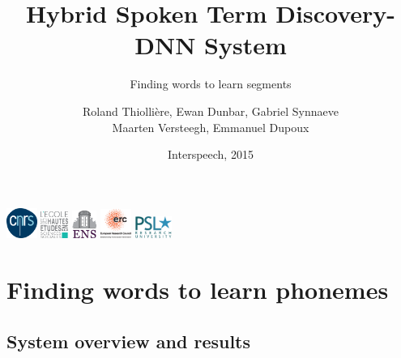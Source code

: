 \documentclass{beamer}
\title[Hybrid STD-DNN system]{
Hybrid Spoken Term Discovery-DNN System
}
\subtitle{Finding words to learn segments}
\author[Roland Thiolliere]{
Roland Thiolli\`ere\inst{*}, Ewan Dunbar\inst{*}, Gabriel Synnaeve\inst{*\dagger}\\Maarten Versteegh\inst{*}, Emmanuel Dupoux\inst{*}
}
\institute[ENS] %
{
\inst{*} LSCP, \'{E}cole Normale Sup\'{e}rieure / EHESS / CNRS, Paris, France\\%
\inst{\dagger} now at Facebook AI Research\\[0.5ex]
\inst{} \begin{small}\texttt{rolthiolliere@gmail.com, emd@umd.edu, gabrielsynnaeve@gmail.com, maartenversteegh@gmail.com, emmanuel.dupoux@gmail.com}\end{small}
}
\date{Interspeech, 2015}
\begin{document}
\begin{frame}
  \titlepage
  \includegraphics[width=1cm]{CNRS_LOGO.eps}
  \hfill
  \includegraphics[width=0.9cm]{EHESS_LOGO}
  \hfill
  \includegraphics[width=0.8cm]{ENS_LOGO}
  \hfill
  \includegraphics[width=1cm]{ERC_LOGO}
  \hfill
  \includegraphics[width=1.2cm]{PSL_LOGO}


\end{frame}


\section{Finding words to learn phonemes}

\subsection{System overview and results}
\end{document}
